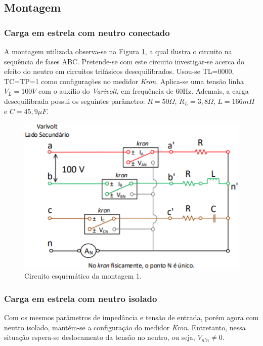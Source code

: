\documentclass[a4paper,12pt,oneside,openany,table,xcdraw]{article}
\begin{document}
\subsection{Montagem} %

\subsubsection{Carga em estrela com neutro conectado} \label{m1:montagem}
A montagem utilizada observa-se na Figura \ref{m1:esquema}, a qual ilustra o circuito na sequência de fases ABC. Pretende-se com este circuito investigar-se acerca do efeito do neutro em circuitos trifásicos desequilibrados. Usou-se TL=0000, TC=TP=1 como configurações no medidor \emph{Kron}. Aplica-se uma tensão linha $V_L=100V$ com o auxílio do \emph{Varivolt}, em frequência de 60Hz. Ademais, a carga desequilibrada possui os seguintes parâmetro: $R=50\Omega$, $R_L=3,8\Omega$, $L=166mH$ e $C=45,9 \mu F$.

\vspace{0.2cm}
\begin{figure}[H]
\centering
\includegraphics[width=13cm]{m1-circuito}
\caption{Circuito esquemático da montagem 1.}
\label{m1:esquema}
\end{figure}

\subsubsection{Carga em estrela com neutro isolado} \label{m2:montagem}
Com os mesmos parâmetros de impedância e tensão de entrada, porém agora com neutro isolado, mantém-se a configuração do medidor \emph{Kron}. Entretanto, nessa situação espera-se deslocamento da tensão no neutro, ou seja, $V_{n'n} \ne 0$.
\end{document}
